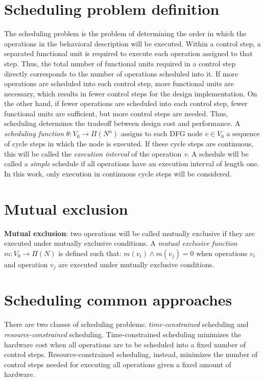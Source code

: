 \hypertarget{src_HLS_scheduling_general_scheduling_definition}{}\section{Scheduling problem definition}\label{src_HLS_scheduling_general_scheduling_definition}
The scheduling problem is the problem of determining the order in which the operations in the behavioral description will be executed. Within a control step, a separated functional unit is required to execute each operation assigned to that step. Thus, the total number of functional units required in a control step directly corresponds to the number of operations scheduled into it. If more operations are scheduled into each control step, more functional units are necessary, which results in fewer control steps for the design implementation. On the other hand, if fewer operations are scheduled into each control step, fewer functional units are sufficient, but more control steps are needed. Thus, scheduling determines the tradeoff between design cost and performance. A {\itshape scheduling function} $\theta : V_0 \rightarrow \Pi(N^n)$ assigns to each D\+FG node $v \in V_0$ a sequence of cycle steps in which the node is executed. If these cycle steps are continuous, this will be called the {\itshape execution interval} of the operation {\itshape v}. A schedule will be called a {\itshape simple} schedule if all operations have an execution interval of length one. In this work, only execution in continuous cycle steps will be considered.\hypertarget{src_HLS_scheduling_general_mutual_exclusion}{}\section{Mutual exclusion}\label{src_HLS_scheduling_general_mutual_exclusion}
{\bfseries Mutual exclusion}\+: two operations will be called mutually exclusive if they are executed under mutually exclusive conditions. A {\itshape mutual exclusive function} $m : V_0 \rightarrow \Pi(N)$ is defined such that\+: $m(v_i) \wedge m(v_j) = 0$ when operations $v_i$ and operation $v_j$ are executed under mutually exclusive conditions.\hypertarget{src_HLS_scheduling_general_scheduling_approach}{}\section{Scheduling common approaches}\label{src_HLS_scheduling_general_scheduling_approach}
There are two classes of scheduling problems\+: {\itshape time-\/constrained} scheduling and {\itshape resource-\/constrained} scheduling. Time-\/constrained scheduling minimizes the hardware cost when all operations are to be scheduled into a fixed number of control steps. Resource-\/constrained scheduling, instead, minimizes the number of control steps needed for executing all operations given a fixed amount of hardware.

